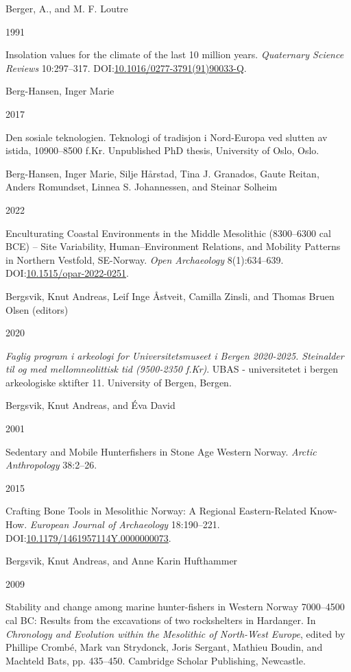 \documentclass[
  a4paper,
  oneside]{uiophdthesis}
\newlength{\cslhangindent}
\newlength{\csllabelwidth}
\newlength{\cslentryspacingunit} %
\newenvironment{CSLReferences}[2] %
 {%
  \setlength{\parindent}{0pt}
  \ifodd #1
  \let\oldpar\par
  \def\par{\hangindent=\cslhangindent\oldpar}
  \fi
  \setlength{\parskip}{#2\cslentryspacingunit}
 }%
 {}
\newcommand{\CSLBlock}[1]{#1\hfill\break}
\newcommand{\CSLLeftMargin}[1]{\parbox[t]{\csllabelwidth}{#1}}
\newcommand{\CSLRightInline}[1]{\parbox[t]{\linewidth - \csllabelwidth}{#1}\break}
\begin{document}
\begin{CSLReferences}{0}{0}
\leavevmode{}%
\CSLBlock{Berger, A., and M. F. Loutre}
\CSLLeftMargin{ 1991}
\CSLRightInline{Insolation values for the climate of the last 10 million years. \emph{Quaternary Science Reviews} 10:297--317. DOI:\href{https://doi.org/10.1016/0277-3791(91)90033-Q}{10.1016/0277-3791(91)90033-Q}.}

\leavevmode{}%
\CSLBlock{Berg-Hansen, Inger Marie}
\CSLLeftMargin{ 2017}
\CSLRightInline{{Den sosiale teknologien. Teknologi of tradisjon i Nord-Europa ved slutten av istida, 10900--8500 f.Kr}. Unpublished PhD thesis, University of Oslo, Oslo.}

\leavevmode{}%
\CSLBlock{Berg-Hansen, Inger Marie, Silje Hårstad, Tina J. Granados, Gaute Reitan, Anders Romundset, Linnea S. Johannessen, and Steinar Solheim}
\CSLLeftMargin{ 2022}
\CSLRightInline{{Enculturating Coastal Environments in the Middle Mesolithic (8300--6300 cal BCE) -- Site Variability, Human--Environment Relations, and Mobility Patterns in Northern Vestfold, SE-Norway}. \emph{Open Archaeology} 8(1):634--639. DOI:\href{https://doi.org/10.1515/opar-2022-0251}{10.1515/opar-2022-0251}.}

\leavevmode{}%
\CSLBlock{Bergsvik, Knut Andreas, Leif Inge Åstveit, Camilla Zinsli, and Thomas Bruen Olsen (editors)}
\CSLLeftMargin{ 2020}
\CSLRightInline{\emph{{Faglig program i arkeologi for Universitetsmuseet i Bergen 2020-2025. Steinalder til og med mellomneolittisk tid (9500-2350 f.Kr)}}. UBAS - universitetet i bergen arkeologiske sktifter 11. University of Bergen, Bergen.}

\leavevmode{}%
\CSLBlock{Bergsvik, Knut Andreas, and Éva David}
\CSLLeftMargin{ 2001}
\CSLRightInline{{Sedentary and Mobile Hunterfishers in Stone Age Western Norway}. \emph{Arctic Anthropology} 38:2--26.}

\leavevmode{}%
\CSLLeftMargin{ 2015 }
\CSLRightInline{{Crafting Bone Tools in Mesolithic Norway: A Regional Eastern-Related Know-How}. \emph{European Journal of Archaeology} 18:190--221. DOI:\href{https://doi.org/10.1179/1461957114Y.0000000073}{10.1179/1461957114Y.0000000073}.}

\leavevmode{}%
\CSLBlock{Bergsvik, Knut Andreas, and Anne Karin Hufthammer}
\CSLLeftMargin{ 2009}
\CSLRightInline{{Stability and change among marine hunter-fishers in Western Norway 7000--4500 cal BC: Results from the excavations of two rockshelters in Hardanger}. In \emph{{Chronology and Evolution within the Mesolithic of North-West Europe}}, edited by Phillipe Crombé, Mark van Strydonck, Joris Sergant, Mathieu Boudin, and Machteld Bats, pp. 435--450. Cambridge Scholar Publishing, Newcastle.}


\end{CSLReferences}
\end{document}
